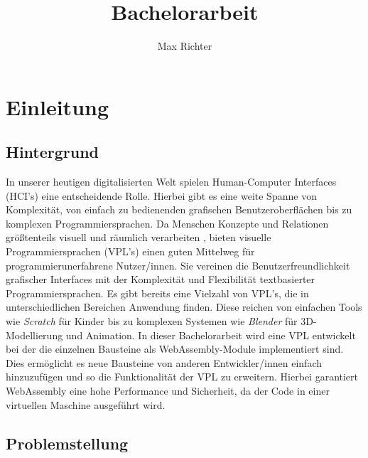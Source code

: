 \documentclass[ngerman]{article}
\title{Bachelorarbeit}
\author{Max Richter}
\begin{document}
\pagestyle{fancy}
\fancyhead{} %
\fancyfoot{} %
\fancyfoot[LE,RO]{\thepage}

\raggedright

\maketitle
\pagebreak

\tableofcontents

\pagebreak

\section{Einleitung}

\subsection{Hintergrund}
In unserer heutigen digitalisierten Welt spielen Human-Computer Interfaces (HCI's) eine entscheidende Rolle.
Hierbei gibt es eine weite Spanne von Komplexität, von einfach zu bedienenden grafischen Benutzeroberflächen bis zu komplexen Programmiersprachen. 
\br
Da Menschen Konzepte und Relationen größtenteils visuell und räumlich verarbeiten \cite{smith1975pygmalion}, bieten visuelle Programmiersprachen (VPL's) einen guten Mittelweg für programmierunerfahrene Nutzer/innen. 
Sie vereinen die Benutzerfreundlichkeit grafischer Interfaces mit der Komplexität und Flexibilität textbasierter Programmiersprachen.
\br
Es gibt bereits eine Vielzahl von VPL's, die in unterschiedlichen Bereichen Anwendung finden. 
Diese reichen von einfachen Tools wie \textit{Scratch} für Kinder bis zu komplexen Systemen wie \textit{Blender} für 3D-Modellierung und Animation.
\br
In dieser Bachelorarbeit wird eine VPL entwickelt bei der die einzelnen Bausteine als WebAssembly-Module implementiert sind. 
Dies ermöglicht es neue Bausteine von anderen Entwickler/innen einfach hinzuzufügen und so die Funktionalität der VPL zu erweitern.
Hierbei garantiert WebAssembly eine hohe Performance und Sicherheit, da der Code in einer virtuellen Maschine ausgeführt wird.

\subsection{Problemstellung}
\end{document}
